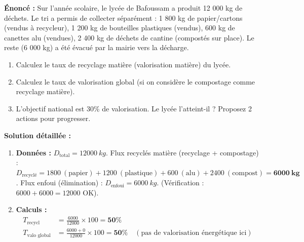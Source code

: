 \documentclass[11pt]{article}
\begin{document}
\begin{exoresolu}
\textbf{Énoncé :} Sur l'année scolaire, le lycée de Bafoussam a produit 12 000 kg de déchets. Le tri a permis de collecter séparément : 1 800 kg de papier/cartons (vendus à recycleur), 1 200 kg de bouteilles plastiques (vendus), 600 kg de canettes alu (vendues), 2 400 kg de déchets de cantine (compostés sur place). Le reste (6 000 kg) a été évacué par la mairie vers la décharge.
\begin{enumerate}
    \item Calculez le taux de recyclage matière (valorisation matière) du lycée.
    \item Calculez le taux de valorisation global (si on considère le compostage comme recyclage matière).
    \item L'objectif national est 30\% de valorisation. Le lycée l'atteint-il ? Proposez 2 actions pour progresser.
\end{enumerate}

\tcblower

\textbf{Solution détaillée :}
\begin{enumerate}
    \item \textbf{Données :}
    $D_{\text{total}} = \SI{12000}{kg}$.
    Flux recyclés matière (recyclage + compostage) :
    $D_{\text{recyclé}} = 1800\ (\text{papier}) + 1200\ (\text{plastique}) + 600\ (\text{alu}) + 2400\ (\text{compost}) = \mathbf{6000\ kg}$.
    Flux enfoui (élimination) : $D_{\text{enfoui}} = \SI{6000}{kg}$. (Vérification : $6000 + 6000 = 12000$ OK).
    
    \item \textbf{Calculs :}
    \begin{align*}
    T_{\text{recycl}} &= \frac{6000}{12000} \times 100 = \mathbf{50\%} \\
    T_{\text{valo global}} &= \frac{6000 + 0}{12000} \times 100 = \mathbf{50\%} \quad (\text{pas de valorisation énergétique ici})
    \end{align*}
    

\end{enumerate}
\end{exoresolu}
\end{document}
